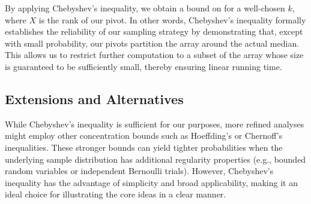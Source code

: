 By applying Chebyshev’s inequality, we obtain a bound on  for a well-chosen \(k\), where \(X\) is the rank of our pivot.
In other words, Chebyshev’s inequality formally establishes the reliability of our sampling strategy by demonstrating that, except with small probability, our pivots partition the array around the actual median. This allows us to restrict further computation to a subset of the array whose size is guaranteed to be sufficiently small, thereby ensuring linear running time.

\subsection*{Extensions and Alternatives}
While Chebyshev’s inequality is sufficient for our purposes, more refined analyses might employ other concentration bounds such as Hoeffding’s or Chernoff’s inequalities. These stronger bounds can yield tighter probabilities when the underlying sample distribution has additional regularity properties (e.g., bounded random variables or independent Bernoulli trials). However, Chebyshev’s inequality has the advantage of simplicity and broad applicability, making it an ideal choice for illustrating the core ideas in a clear manner.
